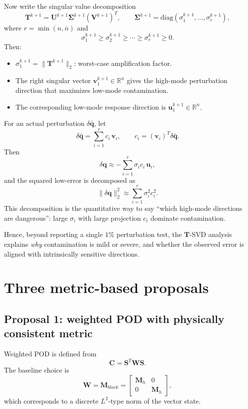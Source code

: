 \documentclass[11pt]{article}
\begin{document}
Now write the singular value decomposition
\[
\mathbf T^{k+1}=\mathbf U^{k+1}\mathbf\Sigma^{k+1}(\mathbf V^{k+1})^T,
\qquad
\mathbf\Sigma^{k+1}=
\mathrm{diag}(\sigma_1^{k+1},\ldots,\sigma_r^{k+1}),
\]
where \(r=\min(n,\bar n)\) and
\[
\sigma_1^{k+1}\ge \sigma_2^{k+1}\ge\cdots\ge\sigma_r^{k+1}\ge 0.
\]
Then:
\begin{itemize}[leftmargin=1.5em]
\item \(\sigma_1^{k+1}=\|\mathbf T^{k+1}\|_2\): worst-case amplification factor.
\item The right singular vector \(\mathbf v_1^{k+1}\in\mathbb R^{\bar n}\) gives the high-mode perturbation direction that maximizes low-mode contamination.
\item The corresponding low-mode response direction is \(\mathbf u_1^{k+1}\in\mathbb R^n\).
\end{itemize}

For an actual perturbation \(\delta\bar{\mathbf q}\), let
\[
\delta\bar{\mathbf q}=\sum_{i=1}^{r} c_i\,\mathbf v_i,
\qquad
c_i=(\mathbf v_i)^T\delta\bar{\mathbf q}.
\]
Then
\[
\delta\mathbf q
\approx
-\sum_{i=1}^{r}\sigma_i c_i\,\mathbf u_i,
\]
and the squared low-error is decomposed as
\[
\|\delta\mathbf q\|_2^2
\approx
\sum_{i=1}^{r}\sigma_i^2 c_i^2.
\]
This decomposition is the quantitative way to say ``which high-mode directions are dangerous'':
large \(\sigma_i\) with large projection \(c_i\) dominate contamination.

Hence, beyond reporting a single \(1\%\) perturbation test, the \(\mathbf T\)-SVD analysis explains \emph{why} contamination is mild or severe, and whether the observed error is aligned with intrinsically sensitive directions.

\section{Three metric-based proposals}
\subsection*{Proposal 1: weighted POD with physically consistent metric}
Weighted POD is defined from
\[
\mathbf C=\mathbf S^T\mathbf W\mathbf S.
\]
The baseline choice is
\[
\mathbf W=\mathbf M_{block}=
\begin{bmatrix}
\mathbf M_h & 0\\
0 & \mathbf M_h
\end{bmatrix},
\]
which corresponds to a discrete \(L^2\)-type norm of the vector state.
\end{document}
